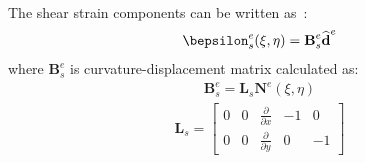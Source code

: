 \documentclass[a4paper,12pt]{article}
\begin{document}
{\begin{eqnarray}
\end{eqnarray}
The shear strain components can be written as~\cite{ferreira2008matlab}:
\begin{eqnarray}
\bepsilon_s^e(\xi,\eta)=\textbf{B}_s^e\widehat{\textbf{d}}^e
\end{eqnarray}
where \(\textbf{B}_s^e\) is curvature-displacement matrix calculated as:
\begin{eqnarray}
\textbf{B}_s^e=\textbf{L}_s\textbf{N}^e(\xi,\eta)
\end{eqnarray}
\begin{eqnarray}
\textbf{L}_s=\left [
\begin{array}{ccccc}
0 & 0 & \frac{\partial }{\partial x} & -1 & 0 \\
0 & 0 & \frac{\partial }{\partial y} & 0 & -1
\end{array} \right]
\end{eqnarray}
}
\end{document}
